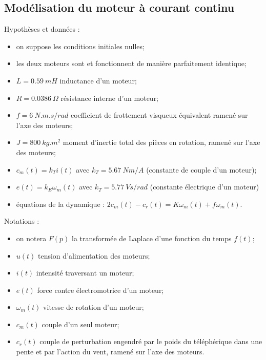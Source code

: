 \documentclass[10pt,fleqn]{article} %
\begin{document}
\subsection{Modélisation du moteur à courant continu}
\begin{multicols}{2}

Hypothèses et données :
\begin{itemize}
\item on suppose les conditions initiales nulles;
\item les deux moteurs sont et fonctionnent de manière parfaitement identique;
\item $L=\SI{0,59}{mH}$ inductance d’un moteur;
\item $R=\SI{0,0386}{\Omega}$ résistance interne d’un moteur;
\item $f=\SI{6}{N.m.s/rad}$ coefficient de frottement visqueux équivalent ramené sur l’axe des moteurs;
\item $J=\SI{800}{kg.m^2}$ moment d’inertie total des pièces en rotation, ramené sur l’axe des moteurs; 
\item $c_m(t)=k_Ti(t)$ avec $k_T=\SI{5.67}{Nm/A}$ (constante de couple d’un moteur);
\item $e(t)=k_E\omega_m(t)$ avec $k_T=\SI{5.77}{Vs/rad}$   (constante électrique d’un moteur)
\item équations de la dynamique : $2c_m(t)-c_r(t)=K\omega_m(t)+f\omega_m(t)$.
\end{itemize}

\vspace{1.7cm}

Notations :

\begin{itemize}
\item on notera $F(p)$ la transformée de Laplace d’une fonction du temps $f(t)$;
\item $u(t)$ tension d’alimentation des moteurs;
\item $i(t)$ intensité traversant un moteur;
\item $e(t)$ force contre électromotrice d’un moteur;
\item $\omega_m(t)$ vitesse de rotation d’un moteur;
\item $c_m(t)$ couple d’un seul moteur;
\item $c_r(t)$ couple de perturbation engendré par le poids du téléphérique dans une pente et par l’action du vent, ramené sur l’axe des moteurs.
\end{itemize}
\end{multicols}
\end{document}
